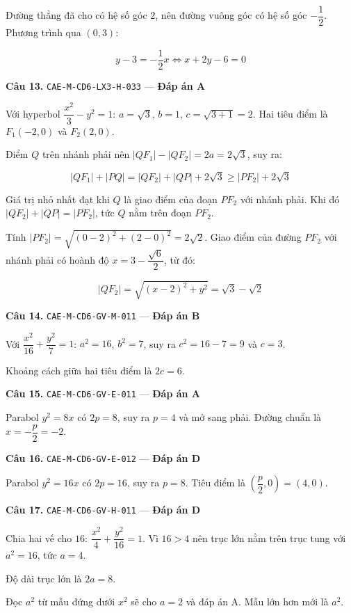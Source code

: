 \documentclass[11pt, a4paper]{article}
\begin{document}
Đường thẳng đã cho có hệ số góc $2$, nên đường vuông góc có hệ số góc $-\dfrac{1}{2}$. Phương trình qua $(0,3)$:

$$y - 3 = -\frac{1}{2}x \iff x + 2y - 6 = 0$$

\textbf{Câu 13.} \texttt{CAE-M-CD6-LX3-H-033} — \textbf{Đáp án A}

Với hyperbol $\dfrac{x^2}{3} - y^2 = 1$: $a = \sqrt{3}$, $b = 1$, $c = \sqrt{3 + 1} = 2$. Hai tiêu điểm là $F_1(-2,0)$ và $F_2(2,0)$.

Điểm $Q$ trên nhánh phải nên $\lvert QF_1 \rvert - \lvert QF_2 \rvert = 2a = 2\sqrt{3}$, suy ra:

$$\lvert QF_1 \rvert + \lvert PQ \rvert = \lvert QF_2 \rvert + \lvert QP \rvert + 2\sqrt{3} \ge \lvert PF_2 \rvert + 2\sqrt{3}$$

Giá trị nhỏ nhất đạt khi $Q$ là giao điểm của đoạn $PF_2$ với nhánh phải. Khi đó $\lvert QF_2 \rvert + \lvert QP \rvert = \lvert PF_2 \rvert$, tức $Q$ nằm trên đoạn $PF_2$.

Tính $\lvert PF_2 \rvert = \sqrt{(0-2)^2 + (2-0)^2} = 2\sqrt{2}$. Giao điểm của đường $PF_2$ với nhánh phải có hoành độ $x = 3 - \dfrac{\sqrt{6}}{2}$, từ đó:

$$\lvert QF_2 \rvert = \sqrt{(x-2)^2 + y^2} = \sqrt{3} - \sqrt{2}$$

\textbf{Câu 14.} \texttt{CAE-M-CD6-GV-M-011} — \textbf{Đáp án B}

Với $\dfrac{x^2}{16} + \dfrac{y^2}{7} = 1$: $a^2 = 16$, $b^2 = 7$, suy ra $c^2 = 16 - 7 = 9$ và $c = 3$.

Khoảng cách giữa hai tiêu điểm là $2c = 6$.

\textbf{Câu 15.} \texttt{CAE-M-CD6-GV-E-011} — \textbf{Đáp án A}

Parabol $y^2 = 8x$ có $2p = 8$, suy ra $p = 4$ và mở sang phải. Đường chuẩn là $x = -\dfrac{p}{2} = -2$.

\textbf{Câu 16.} \texttt{CAE-M-CD6-GV-E-012} — \textbf{Đáp án D}

Parabol $y^2 = 16x$ có $2p = 16$, suy ra $p = 8$. Tiêu điểm là $\left(\dfrac{p}{2}, 0\right) = (4, 0)$.

\textbf{Câu 17.} \texttt{CAE-M-CD6-GV-H-011} — \textbf{Đáp án D}

Chia hai vế cho $16$: $\dfrac{x^2}{4} + \dfrac{y^2}{16} = 1$. Vì $16 > 4$ nên trục lớn nằm trên trục tung với $a^2 = 16$, tức $a = 4$.

Độ dài trục lớn là $2a = 8$.

 Đọc $a^2$ từ mẫu đứng dưới $x^2$ sẽ cho $a = 2$ và đáp án A. Mẫu lớn hơn mới là $a^2$.
\end{document}

